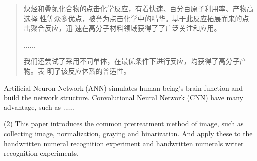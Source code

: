 \begin{abstract}
  炔烃和叠氮化合物的点击化学反应，有着快速、百分百原子利用率、产物高选择
  性等众多优点，被誉为点击化学中的精华。基于此反应拓展而来的点击聚合反应，迅
  速在高分子材料领域获得了了广泛关注和应用。

  ......
  
  我们还尝试了采用不同单体，在最优条件下进行反应，均获得了高分子产物。表
  明了该反应体系的普适性。

\end{abstract}
\begin{englishabstract}
  Artificial Neuron Network (ANN) simulates human being’s brain 
  function and build the network structure. Convolutional Neural 
  Network (CNN) have many advantage, such as ...... 
  
  (2) This paper introduces the common pretreatment method of image, 
  such as collecting image, normalization, graying and binarization. 
  And apply these to the handwritten numeral recognition experiment 
  and handwritten numerals writer recognition experiments.
\end{englishabstract}